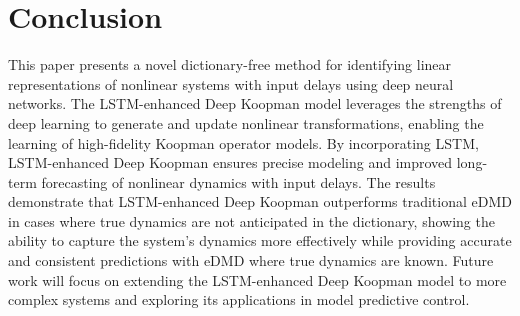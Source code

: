 \documentclass[conference]{IEEEtran}
\begin{document}
\section{Conclusion}
This paper presents a novel dictionary-free method for identifying linear representations of nonlinear systems with input delays using deep neural networks. The LSTM-enhanced Deep Koopman model leverages the strengths of deep learning to generate and update nonlinear transformations, enabling the learning of high-fidelity Koopman operator models. By incorporating LSTM, LSTM-enhanced Deep Koopman ensures precise modeling and improved long-term forecasting of nonlinear dynamics with input delays. The results demonstrate that LSTM-enhanced Deep Koopman outperforms traditional eDMD in cases where true dynamics are not anticipated in the dictionary, showing the ability to capture the system's dynamics more effectively while providing accurate and consistent predictions with eDMD where true dynamics are known. Future work will focus on extending the LSTM-enhanced Deep Koopman model to more complex systems and exploring its applications in model predictive control.



\end{document}
